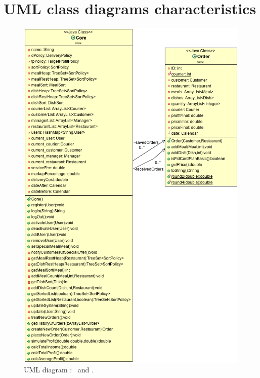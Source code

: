 \section{UML class diagrams characteristics} %
\label{sec:uml_class_diagrams_characteristics}
\newcommand{\umld}{UML diagram : }
\begin{figure}[H]
  \begin{center}
    \includegraphics[scale=0.57]{./img/CoreDiagram.png}
    \end{center}
  \caption{\umld \Core~and \Order.}
  \label{fig:core_order_uml}
\end{figure}
